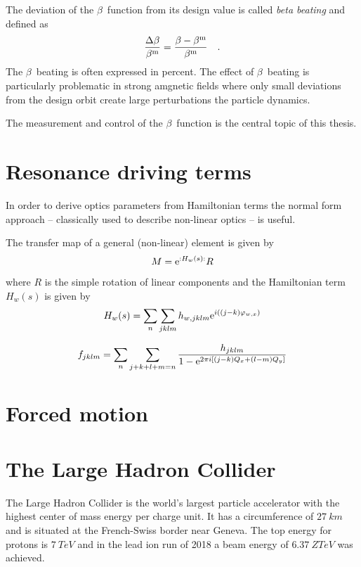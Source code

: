 The deviation of the $\beta$~function from its design value is called \emph{beta beating} and defined as 
\begin{equation}
    \frac{\Delta\beta}{\beta^\text{m}} = \frac{\beta - \beta^\text{m}}{\beta^\text{m}}
    \label{eq_def_beta_beat}
    \quad .
\end{equation}
The $\beta$~beating is often expressed in percent.
The effect of $\beta$~beating is particularly problematic in strong amgnetic fields where only small
deviations from the design orbit create large perturbations the particle dynamics.



The measurement and control of the $\beta$~function is the central topic of this thesis. 


\section{Resonance driving terms}

In order to derive optics parameters from Hamiltonian terms the normal form approach -- classically
used to describe non-linear optics -- is useful. 

The transfer map of a general (non-linear) element is given by
\begin{equation}
    M= \text{e}^{:H_w(s):}R
\end{equation}
where $R$ is the simple rotation of linear components and the Hamiltonian term $H_w(s)$ is given by
\begin{equation}
    H_w(s) = \sum\limits_n\sum\limits_{jklm} h_{w,jklm}\text{e}^{i\left((j-k)\varphi_{w,x}\right)}
\end{equation}

\begin{equation}
    f_{jklm}=\sum\limits_{n}\sum\limits_{j+k+l+m=n} \frac{h_{jklm} }{1-\text{e}^{2\pi i [(j-k)Q_x+(l-m)Q_y]}}
\end{equation}


\section{Forced motion}

\section{The Large Hadron Collider}

The Large Hadron Collider is the world's largest particle accelerator with the highest center of mass
energy per charge unit. It has a circumference of $\SI{27}{km}$ and is situated at the French-Swiss 
border near Geneva. The top energy for protons is $\SI{7}{TeV}$
and in the lead ion run of 2018 a beam energy of $\SI{6.37}{Z TeV}$ was achieved.

